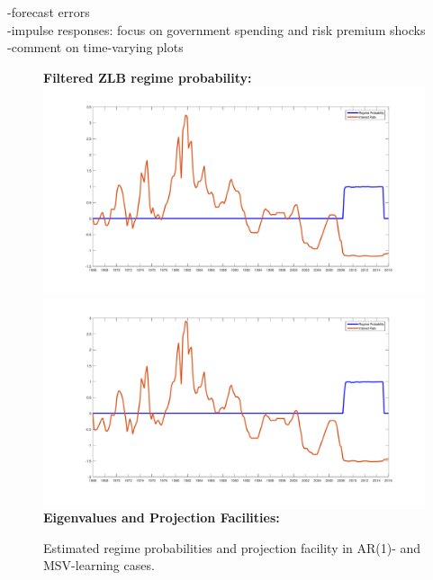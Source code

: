 \documentclass[12pt,reqno]{article}
\numberwithin{equation}{section}
\begin{document}
-forecast errors\\
-impulse responses: focus on government spending and risk premium shocks\\
-comment on time-varying plots\\


\begin{figure}[H]
\label{sw_regime_prob}
\caption{Estimated regime probabilities and projection facility in AR(1)- and MSV-learning cases.} 
\vspace{5 mm}
\textbf{Filtered ZLB regime probability:}\\

\includegraphics[scale=0.23]{sw_ar1_regimeProb.pdf}
\includegraphics[scale=0.23]{sw_msv_regimeProb.pdf}\\

\textbf{Eigenvalues and Projection Facilities:}\\


\end{figure}
\end{document}
